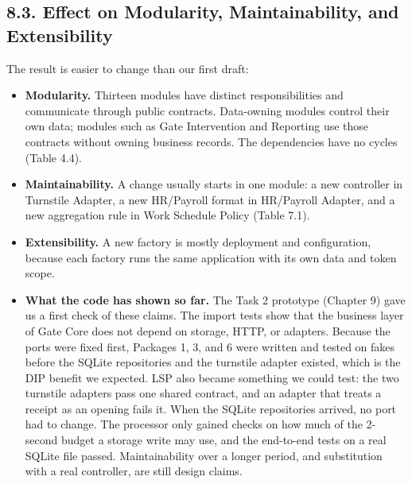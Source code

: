 \subsection*{8.3. Effect on Modularity, Maintainability, and Extensibility}

{}


The result is easier to change than our first draft:

\begin{itemize}[leftmargin=36pt, itemsep=2pt, topsep=4pt, parsep=2pt]
  \item \textbf{Modularity.} Thirteen modules have distinct responsibilities and communicate through public contracts. Data-owning modules control their own data; modules such as Gate Intervention and Reporting use those contracts without owning business records. The dependencies have no cycles (Table 4.4).
  \item \textbf{Maintainability.} A change usually starts in one module: a new controller in Turnstile Adapter, a new HR/Payroll format in HR/Payroll Adapter, and a new aggregation rule in Work Schedule Policy (Table 7.1).
  \item \textbf{Extensibility.} A new factory is mostly deployment and configuration, because each factory runs the same application with its own data and token scope.
  \item \textbf{What the code has shown so far.} The Task 2 prototype (Chapter 9) gave us a first check of these claims. The import tests show that the business layer of Gate Core does not depend on storage, HTTP, or adapters. Because the ports were fixed first, Packages 1, 3, and 6 were written and tested on fakes before the SQLite repositories and the turnstile adapter existed, which is the DIP benefit we expected. LSP also became something we could test: the two turnstile adapters pass one shared contract, and an adapter that treats a receipt as an opening fails it. When the SQLite repositories arrived, no port had to change. The processor only gained checks on how much of the 2-second budget a storage write may use, and the end-to-end tests on a real SQLite file passed. Maintainability over a longer period, and substitution with a real controller, are still design claims.
\end{itemize}
